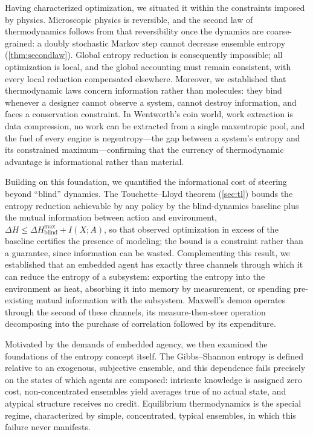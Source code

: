 \documentclass[11pt]{article}
\begin{document}
Having characterized optimization, we situated it within the constraints imposed by physics. Microscopic physics is reversible, and the second law of thermodynamics follows from that reversibility once the dynamics are coarse-grained: a doubly stochastic Markov step cannot decrease ensemble entropy (\cref{thm:secondlaw}). Global entropy reduction is consequently impossible; all optimization is local, and the global accounting must remain consistent, with every local reduction compensated elsewhere. Moreover, we established that thermodynamic laws concern information rather than molecules: they bind whenever a designer cannot observe a system, cannot destroy information, and faces a conservation constraint. In Wentworth's coin world, work extraction is data compression, no work can be extracted from a single maxentropic pool, and the fuel of every engine is negentropy---the gap between a system's entropy and its constrained maximum---confirming that the currency of thermodynamic advantage is informational rather than material.

Building on this foundation, we quantified the informational cost of steering beyond ``blind'' dynamics. The Touchette--Lloyd theorem (\cref{sec:tl}) bounds the entropy reduction achievable by any policy by the blind-dynamics baseline plus the mutual information between action and environment, $\Delta H \le \Delta H^{\max}_{\mathrm{blind}} + I(X;A)$, so that observed optimization in excess of the baseline certifies the presence of modeling; the bound is a constraint rather than a guarantee, since information can be wasted. Complementing this result, we established that an embedded agent has exactly three channels through which it can reduce the entropy of a subsystem: exporting the entropy into the environment as heat, absorbing it into memory by measurement, or spending pre-existing mutual information with the subsystem. Maxwell's demon operates through the second of these channels, its measure-then-steer operation decomposing into the purchase of correlation followed by its expenditure.

Motivated by the demands of embedded agency, we then examined the foundations of the entropy concept itself. The Gibbs--Shannon entropy is defined relative to an exogenous, subjective ensemble, and this dependence fails precisely on the states of which agents are composed: intricate knowledge is assigned zero cost, non-concentrated ensembles yield averages true of no actual state, and atypical structure receives no credit. Equilibrium thermodynamics is the special regime, characterized by simple, concentrated, typical ensembles, in which this failure never manifests.
\end{document}
